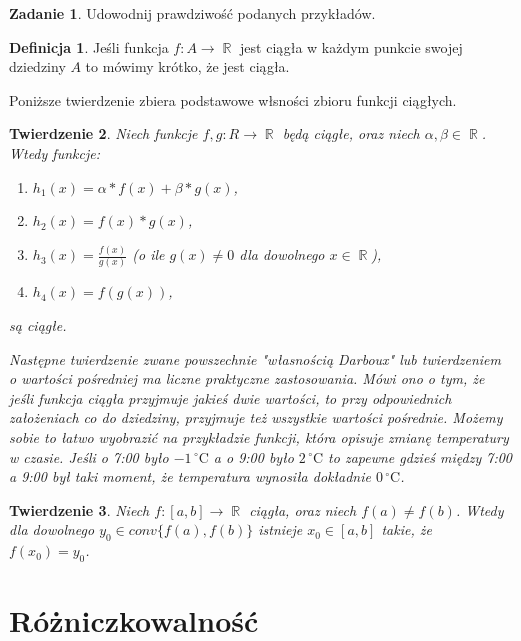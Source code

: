\documentclass[12pt,a4paper]{article}
\newtheorem{tw}{Twierdzenie}[section]
\theoremstyle{definition}
\newtheorem{df}[tw]{Definicja}
\newtheorem{zad}{Zadanie}
\DeclareMathOperator{\R}{\mathbb{R}}
\begin{document}
	\begin{zad}
		Udowodnij prawdziwość podanych przykładów.\\
	\end{zad}
	\begin{df}
		Jeśli funkcja $f:  A \rightarrow \R$ jest ciągła w każdym punkcie swojej dziedziny $A$ to mówimy krótko, że jest ciągła.


		Poniższe twierdzenie zbiera podstawowe włsności zbioru funkcji ciągłych.\\
	\end{df}
	\begin{tw}
		Niech funkcje $f,g: R \rightarrow \R$ będą ciągłe, oraz niech $\alpha, \beta \in \R$.\\
		Wtedy funkcje:
		\begin{enumerate}
			\item[a)] $h_1(x)=\alpha*f(x)+\beta*g(x)$,
			\item[b)] $h_2(x)=f(x)*g(x)$,
			\item[c)] $h_3(x)=\frac{f(x)}{g(x)}$ (o ile $g(x)\neq0$ dla dowolnego $x\in \R$),
			\item[d)] $h_4(x)=f(g(x))$,
		\end{enumerate}
		są ciągłe.


		Następne twierdzenie zwane powszechnie "własnością Darboux" lub twierdzeniem o wartości pośredniej ma liczne praktyczne zastosowania. Mówi ono o tym, że jeśli funkcja ciągła przyjmuje jakieś dwie wartości, to przy odpowiednich założeniach co do dziedziny, przyjmuje  też wszystkie wartości pośrednie. Możemy sobie to łatwo wyobrazić na przykładzie funkcji, która opisuje zmianę temperatury w czasie. Jeśli o 7:00 było $-1\,^{\circ}\mathrm{C}$ a o 9:00 było $2\,^{\circ}\mathrm{C}$ to zapewne gdzieś między 7:00 a 9:00 był taki moment, że temperatura wynosiła dokładnie $0\,^{\circ}\mathrm{C}$.

	\end{tw}
	\begin{tw}
		Niech $f:[a,b] \rightarrow \R$ ciągła, oraz niech $f(a) \neq f(b)$. Wtedy dla dowolnego $y_0 \in conv\{f(a),f(b)\}$ istnieje $x_0 \in [a,b]$ takie, że $f(x_0)=y_0$.
	\end{tw}
\section{Różniczkowalność}
\end{document}
